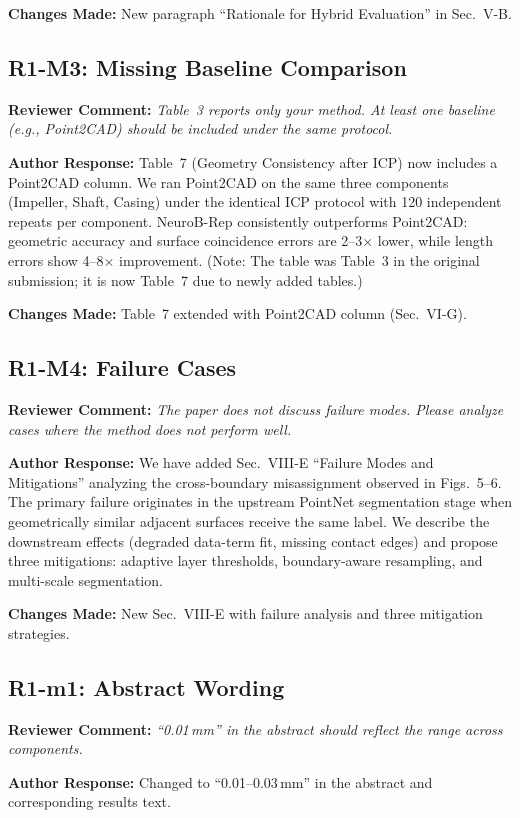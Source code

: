 \documentclass[11pt]{article}
\newcommand{\RC}[1]{\noindent\textcolor{revcolor}{\textbf{Reviewer Comment:} \emph{#1}}\par\medskip}
\newcommand{\AR}[1]{\noindent\textcolor{respcolor}{\textbf{Author Response:} #1}\par\medskip}
\newcommand{\CH}[1]{\noindent\textbf{Changes Made:} #1\par\bigskip}
\begin{document}
\CH{New paragraph ``Rationale for Hybrid Evaluation'' in Sec.~V-B.}

\subsection*{R1-M3: Missing Baseline Comparison}

\RC{Table~3 reports only your method. At least one baseline (e.g.,
Point2CAD) should be included under the same protocol.}

\AR{Table~7 (Geometry Consistency after ICP) now includes a
Point2CAD column. We ran Point2CAD on the same three components
(Impeller, Shaft, Casing) under the identical ICP protocol
with 120 independent repeats per component.
NeuroB-Rep consistently outperforms Point2CAD: geometric accuracy
and surface coincidence errors are 2--3$\times$ lower, while length
errors show 4--8$\times$ improvement.
(Note: The table was Table~3 in the original submission; it is now
Table~7 due to newly added tables.)}

\CH{Table~7 extended with Point2CAD column (Sec.~VI-G).}

\subsection*{R1-M4: Failure Cases}

\RC{The paper does not discuss failure modes. Please analyze cases
where the method does not perform well.}

\AR{We have added Sec.~VIII-E ``Failure Modes and Mitigations''
analyzing the cross-boundary misassignment observed in
Figs.~5--6. The primary failure originates in the upstream
PointNet segmentation stage when geometrically similar adjacent
surfaces receive the same label. We describe the downstream
effects (degraded data-term fit, missing contact edges) and
propose three mitigations: adaptive layer thresholds,
boundary-aware resampling, and multi-scale segmentation.}

\CH{New Sec.~VIII-E with failure analysis and three mitigation
strategies.}

\subsection*{R1-m1: Abstract Wording}

\RC{``0.01\,mm'' in the abstract should reflect the range across
components.}

\AR{Changed to ``0.01--0.03\,mm'' in the abstract and corresponding
results text.}
\end{document}
